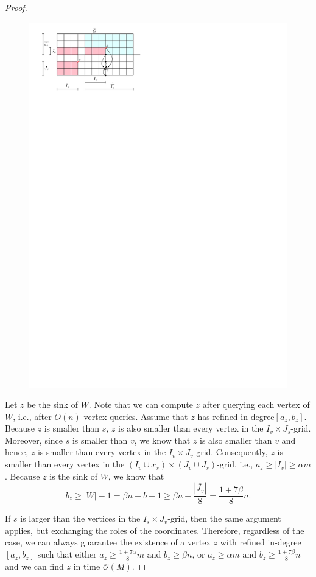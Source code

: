 \documentclass[a4paper,10pt]{article}
\newcommand{\indegree}{refined in-degree\xspace}
\begin{document}
\begin{proof}
\begin{figure}[h]
\centering
\includegraphics{expansion_lemma_fig1.pdf}
\caption{\small }
\label{fig:expansion}
\end{figure}

Let $z$ be the sink of $W$. Note that we can compute $z$ after querying each vertex of $W$, i.e., after $O(n)$ vertex queries. Assume that $z$ has \indegree $[a_z, b_z]$. 
Because $z$ is smaller than $s$, $z$ is also smaller than every vertex in the $I_v\times J_{s}$-grid. Moreover, since $s$ is smaller than $v$, we know that $z$ is also smaller than $v$ and hence, $z$ is smaller than every vertex in the $I_v\times J_v$-grid.
Consequently, $z$ is smaller than every vertex in the $(I_v\cup x_s)\times (J_v\cup J_{s})$-grid, i.e., $a_z\geq |I_v| \geq \alpha m$.
Because $z$ is the sink of $W$, we know that
 $$b_z \geq |W| - 1 = \beta n + b + 1 \geq  \beta n + \frac{|\overline{J_v}|}{8} = \frac{1 + 7\beta}{8}n.$$

If $s$ is larger than the vertices in the $I_{s}\times J_v$-grid, then the same argument applies, but exchanging the roles of the coordinates. Therefore, regardless of the case, we can always guarantee the existence of a vertex $z$ with \indegree $[a_z,b_z]$ such that either $a_z\geq \frac{1+7\alpha}{8}m$ and $b_z \geq \beta n$, or $a_z \geq \alpha m$ and $b_z \geq \frac{1 + 7\beta}{8}n$ and we can find $z$ in time $\mathcal{O}(M)$.
\end{proof}
\end{document}
